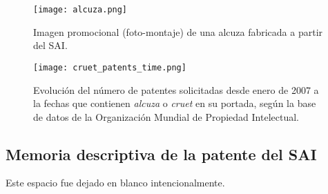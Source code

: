\begin{figure}
  \texttt{[image: alcuza.png]}
  \label{foto_alcuza}
  \caption{Imagen promocional (foto-montaje) de una alcuza fabricada a partir del SAI.}
\end{figure}
\begin{figure}[hb]
  \texttt{[image: cruet\_patents\_time.png]}
  \label{alcuzas_tiempo}
  \caption{Evolución del número de patentes solicitadas desde enero de 2007 a la fechas que contienen \textit{alcuza} o \textit{cruet} en su portada, según la base de datos de la Organización Mundial de Propiedad Intelectual.}
\end{figure}

\newpage

\subsection{Memoria descriptiva de la patente del SAI}
\label{memoria}
\vspace{7cm}
\centering
Este espacio fue dejado en blanco intencionalmente.


% 
